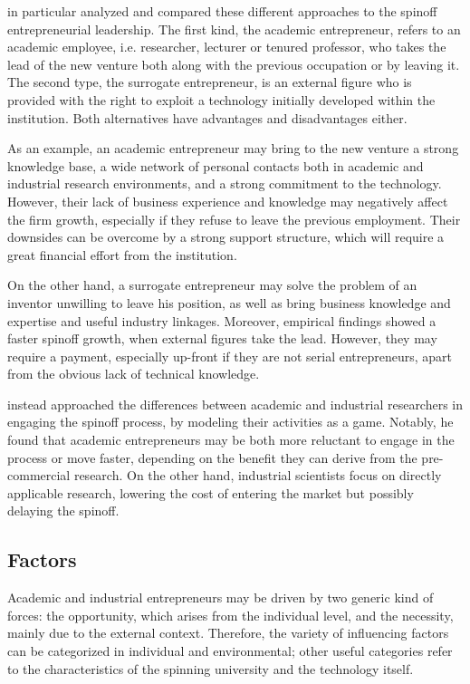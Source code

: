 \citet{Radosevich1995} in particular analyzed and compared these different approaches to the spinoff entrepreneurial leadership. The first kind, the academic entrepreneur, refers to an academic employee, i.e. researcher, lecturer or tenured professor, who takes the lead of the new venture both along with the previous occupation or by leaving it. The second type, the surrogate entrepreneur, is an external figure who is provided with the right to exploit a technology initially developed within the institution. Both alternatives have advantages and disadvantages either.

As an example, an academic entrepreneur may bring to the new venture a strong knowledge base, a wide network of personal contacts both in academic and industrial research environments, and a strong commitment to the technology. However, their lack of business experience and knowledge may negatively affect the firm growth, especially if they refuse to leave the previous employment. Their downsides can be overcome by a strong support structure, which will require a great financial effort from the institution. 

On the other hand, a surrogate entrepreneur may solve the problem of an inventor unwilling to leave his position, as well as bring business knowledge and expertise and useful industry linkages. Moreover, empirical findings showed a faster spinoff growth, when external figures take the lead. However, they may require a payment, especially up-front if they are not serial entrepreneurs, apart from the obvious lack of technical knowledge. 

\citet{Lacetera2006} instead approached the differences between academic and industrial researchers in engaging the spinoff process, by modeling their activities as a game. Notably, he found that academic entrepreneurs may be both more reluctant to engage in the process or move faster, depending on the benefit they can derive from the pre-commercial research. On the other hand, industrial scientists focus on directly applicable research, lowering the cost of entering the market but possibly delaying the spinoff.   

\subsection{Factors}

Academic and industrial entrepreneurs may be driven by two generic kind of forces: the opportunity, which arises from the individual level, and the necessity, mainly due to the external context. Therefore, the variety of influencing factors can be categorized in individual and environmental; other useful categories refer to the characteristics of the spinning university and the technology itself.

